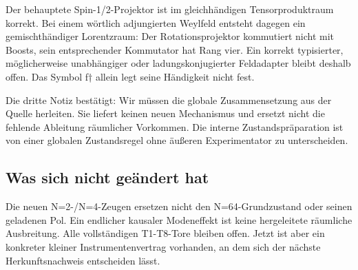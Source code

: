 \documentclass[
  ngerman,
  10pt,
  a4paper,
]{article}
\begin{document}
Der behauptete Spin-1/2-Projektor ist im gleichhändigen
Tensorproduktraum korrekt. Bei einem wörtlich adjungierten Weylfeld
entsteht dagegen ein gemischthändiger Lorentzraum: Der
Rotationsprojektor kommutiert nicht mit Boosts, sein entsprechender
Kommutator hat Rang vier. Ein korrekt typisierter, möglicherweise
unabhängiger oder ladungskonjugierter Feldadapter bleibt deshalb offen.
Das Symbol f† allein legt seine Händigkeit nicht fest.

Die dritte Notiz bestätigt: Wir müssen die globale Zusammensetzung aus
der Quelle herleiten. Sie liefert keinen neuen Mechanismus und ersetzt
nicht die fehlende Ableitung räumlicher Vorkommen. Die interne
Zustandspräparation ist von einer globalen Zustandsregel ohne äußeren
Experimentator zu unterscheiden.

\subsection{Was sich nicht geändert
hat}\label{was-sich-nicht-geuxe4ndert-hat}

Die neuen N=2-/N=4-Zeugen ersetzen nicht den N=64-Grundzustand oder
seinen geladenen Pol. Ein endlicher kausaler Modeneffekt ist keine
hergeleitete räumliche Ausbreitung. Alle vollständigen T1-T8-Tore
bleiben offen. Jetzt ist aber ein konkreter kleiner Instrumentenvertrag
vorhanden, an dem sich der nächste Herkunftsnachweis entscheiden lässt.
\end{document}
